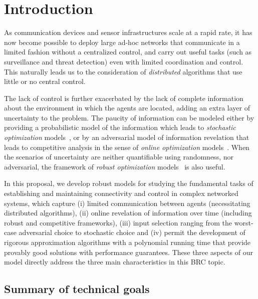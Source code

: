 \section{Introduction}

As communication devices and sensor infrastructures scale at a rapid
rate, it has now become possible to deploy large ad-hoc networks that
communicate in a limited fashion without a centralized control, and
carry out useful tasks (such as surveillance and threat detection)
even with limited coordination and control. This naturally leads us to
the consideration of {\em distributed} algorithms that use little or
no central control.

The lack of control is further exacerbated by the lack of complete
information about the environment in which the agents are located,
adding an extra layer of uncertainty to the problem. The paucity of
information can be modeled either by providing a probabilistic model
of the information which leads to {\em stochastic optimization}
models~\cite{bl97,rs06}, or by an adversarial model of information
revelation that leads to competitive analysis in the sense of {\em online
optimization} models~\cite{be98}. When the scenarios of uncertainty are neither quantifiable using randomness, nor adversarial, the framework of {\em robust optimization} models~\cite{dgrs05} is also useful.

In this proposal, we develop robust models for studying the
fundamental tasks of establishing and maintaining connectivity and
control in complex networked systems, which capture (i) limited
communication between agents (necessitating distributed algorithms),
(ii) online revelation of information over time (including robust 
and competitive frameworks), (iii) input selection ranging from the 
worst-case adversarial choice to stochastic choice and (iv) 
permit the development of
rigorous approximation algorithms with a polynomial running time that
provide provably good solutions with performance guarantees. These
three aspects of our model directly address the three main
characteristics in this BRC topic.

\subsection{Summary of technical goals}
\label{sec:goals}

